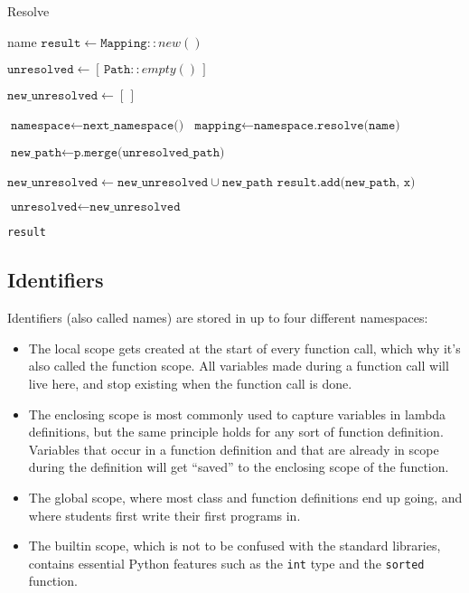 \documentclass[a4paper, 16pt, oneside]{Thesis}
\providecommand{\tightlist}{%
  \setlength{\itemsep}{0pt}\setlength{\parskip}{0pt}}
\begin{document}
\begin{algorithm}
    \caption{Resolve}\label{alg:chain}
    \begin{algorithmic}[1]
         {name}
          \State $\texttt{result} \gets \texttt{Mapping}::new()$

          \State $\texttt{unresolved} \gets [\, \texttt{Path}::empty()\,]$

              \State $\texttt{new\_unresolved} \gets [\,]$

              \State $\texttt{namespace} \gets \texttt{next\_namespace()}$
              \State $\texttt{mapping} \gets \texttt{namespace.resolve(name)}$

                    \State $\texttt{new\_path} \gets \texttt{p.merge(unresolved\_path)}$

                      \State $\texttt{new\_unresolved} \gets \texttt{new\_unresolved} \cup \texttt{new\_path}$
                    \Else 
                      \State $\texttt{result.add(new\_path, x)}$
                    \EndIf
                \EndFor
              \EndFor

              \State $\texttt{unresolved} \gets \texttt{new\_unresolved}$

          \EndWhile

          \State \Return \texttt{result}
        \EndFunction
    \end{algorithmic}
\end{algorithm}

\subsection{Identifiers}\label{identifiers}

Identifiers (also called names) are stored in up to four different
namespaces:

\begin{itemize}
\tightlist
\item
  The local scope gets created at the start of every function call,
  which why it's also called the function scope. All variables made
  during a function call will live here, and stop existing when the
  function call is done.
\item
  The enclosing scope is most commonly used to capture variables in
  lambda definitions, but the same principle holds for any sort of
  function definition. Variables that occur in a function definition and
  that are already in scope during the definition will get ``saved'' to
  the enclosing scope of the function.
\item
  The global scope, where most class and function definitions end up
  going, and where students first write their first programs in.
\item
  The builtin scope, which is not to be confused with the standard
  libraries, contains essential Python features such as the \texttt{int}
  type and the \texttt{sorted} function.
\end{itemize}
\end{document}
